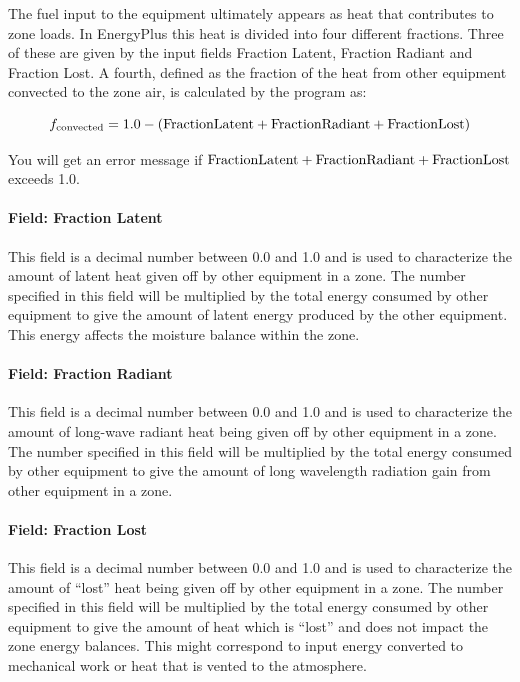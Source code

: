 The fuel input to the equipment ultimately appears as heat that contributes to zone loads. In EnergyPlus this heat is divided into four different fractions. Three of these are given by the input fields Fraction Latent, Fraction Radiant and Fraction Lost. A fourth, defined as the fraction of the heat from other equipment convected to the zone air, is calculated by the program as:

\begin{equation}
  f_{\rm{convected}} = 1.0 - (\rm{Fraction Latent} + \rm{Fraction Radiant} + \rm{Fraction Lost})
\end{equation}

You will get an error message if \(\rm{Fraction Latent} + \rm{Fraction Radiant} + \rm{Fraction Lost}\) exceeds 1.0.

\paragraph{Field: Fraction Latent}\label{field-fraction-latent-4-other-definition}

This field is a decimal number between 0.0 and 1.0 and is used to characterize the amount of latent heat given off by other equipment in a zone. The number specified in this field will be multiplied by the total energy consumed by other equipment to give the amount of latent energy produced by the other equipment. This energy affects the moisture balance within the zone.

\paragraph{Field: Fraction Radiant}\label{field-fraction-radiant-6-other-definition}

This field is a decimal number between 0.0 and 1.0 and is used to characterize the amount of long-wave radiant heat being given off by other equipment in a zone. The number specified in this field will be multiplied by the total energy consumed by other equipment to give the amount of long wavelength radiation gain from other equipment in a zone.

\paragraph{Field: Fraction Lost}\label{field-fraction-lost-4-other-definition}

This field is a decimal number between 0.0 and 1.0 and is used to characterize the amount of ``lost'' heat being given off by other equipment in a zone. The number specified in this field will be multiplied by the total energy consumed by other equipment to give the amount of heat which is ``lost'' and does not impact the zone energy balances. This might correspond to input energy converted to mechanical work or heat that is vented to the atmosphere.

